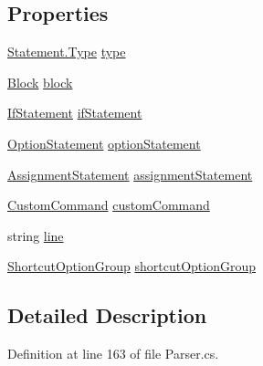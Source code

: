 \subsection*{Properties}
\begin{DoxyCompactItemize}
\item 
\hyperlink{a00156_a518000e4e6219ce5f9f4229f505cd944}{Statement.\-Type} \hyperlink{a00156_aa3fa0eb260e412720562ce06b7dc06fe}{type}
\item 
\hyperlink{a00033}{Block} \hyperlink{a00156_ac14dfc7210974b4cd86402ed011fb0b6}{block}
\item 
\hyperlink{a00108}{If\-Statement} \hyperlink{a00156_a9a71577456598af0f25b23ccd02154e4}{if\-Statement}
\item 
\hyperlink{a00136}{Option\-Statement} \hyperlink{a00156_a15020b7dab4983adbd185d5c2c2ebe84}{option\-Statement}
\item 
\hyperlink{a00029}{Assignment\-Statement} \hyperlink{a00156_a7fa97a80f1b9313bc2bd4194e3f75759}{assignment\-Statement}
\item 
\hyperlink{a00073}{Custom\-Command} \hyperlink{a00156_a8a98e7d4c66f9909da865f0e671d69f2}{custom\-Command}
\item 
string \hyperlink{a00156_a37695c7b00776bb292fd64894a70fb72}{line}
\item 
\hyperlink{a00150}{Shortcut\-Option\-Group} \hyperlink{a00156_a54d73ad69c4af4a0d61edeaea4c8ca4f}{shortcut\-Option\-Group}
\end{DoxyCompactItemize}


\subsection{Detailed Description}


Definition at line 163 of file Parser.\-cs.



